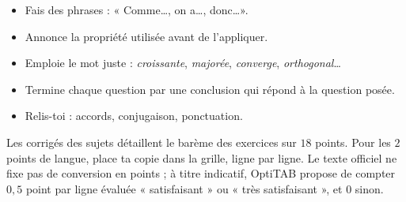 \vspace{7mm}
\noindent
\begin{minipage}[t]{0.48\linewidth}\vspace{0pt}
\begin{tcolorbox}[enhanced,colback=otNavyTint,colframe=otNavyTint,boxrule=0pt,arc=2mm,left=4.5mm,right=4.5mm,top=3.5mm,
  bottom=3.5mm,fontupper=\fontsize{10}{13.5}\selectfont]
\begin{itemize}[label={\color{otNavy}\textbullet},leftmargin=1.1em,itemsep=1.4mm,topsep=0mm]
  \item Fais des phrases : « Comme\dots, on a\dots, donc\dots ».
  \item Annonce la propriété utilisée avant de l'appliquer.
  \item Emploie le mot juste : \emph{croissante}, \emph{majorée}, \emph{converge}, \emph{orthogonal}\dots
  \item Termine chaque question par une conclusion qui répond à la question posée.
  \item Relis-toi : accords, conjugaison, ponctuation.
\end{itemize}
\end{tcolorbox}
\end{minipage}\hfill
\begin{minipage}[t]{0.48\linewidth}\vspace{0pt}
\begin{tcolorbox}[enhanced,colback=otGreenTint,colframe=otGreenTint,boxrule=0pt,arc=2mm,left=4.5mm,right=4.5mm,top=3.5mm,
  bottom=3.5mm,fontupper=\fontsize{10}{13.5}\selectfont]
Les corrigés des sujets détaillent le barème des exercices sur $18$ points. Pour les $2$ points de langue, place ta copie dans
la grille, ligne par ligne. Le texte officiel ne fixe pas de conversion en points ; à titre indicatif, OptiTAB propose de
compter $0{,}5$ point par ligne évaluée « satisfaisant » ou « très satisfaisant », et $0$ sinon.
\end{tcolorbox}
\end{minipage}

